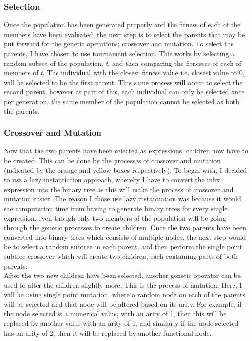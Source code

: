 \documentclass[11pt]{article}
\begin{document}
\subsubsection{Selection}
Once the population has been generated properly and the fitness of each of the members have been evaluated, the next step is to select the parents that may be put forward for the genetic operations; crossover and mutation. To select the parents, I have chosen to use tournament selection. This works by selecting a random subset of the population, \textit{t}, and then comparing the fitnesses of each of members of \textit{t}. The individual with the closest fitness value i.e. closest value to 0, will be selected to be the first parent. This same process will occur to select the second parent, however as part of this, each individual can only be selected once per generation, the same member of the population cannot be selected as both the parents. 
\subsubsection{Crossover and Mutation}
Now that the two parents have been selected as expressions, children now have to be created. This can be done by the processes of crossover and mutation (indicated by the orange and yellow boxes respectively). To begin with, I decided to use a lazy instantiation approach, whereby I have to convert the infix expression into the binary tree as this will make the process of crossover and mutation easier. The reason I chose use lazy instantiation was because it would sae computation time from having to generate binary trees for every single expression, even though only two members of the population will be going through the genetic processes to create children. Once the two parents have been converted into binary trees which consists of multiple nodes, the next step would be to select a random subtree in each parent, and then perform the single point subtree crossover which will create two children, each containing parts of both parents. \\
After the two new children have been selected, another genetic operator can be used to alter the children slightly more. This is the process of mutation. Here, I will be using single point mutation, where a random node on each of the parents will be selected and that node will be altered based on its arity. For example, if the node selected is a numerical value, with an arity of 1, then this will be replaced by another value with an arity of 1, and similarly if the node selected has an arity of 2, then it will be replaced by another functional node. 
\end{document}
